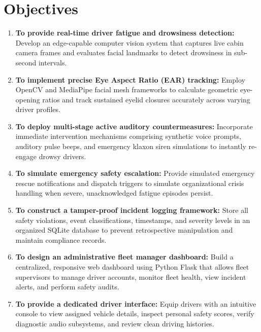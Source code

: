 \documentclass[a4paper,12pt]{report}
\begin{document}
\section{Objectives}
\begin{enumerate}
\item \textbf{To provide real-time driver fatigue and drowsiness detection:}
Develop an edge-capable computer vision system that captures live cabin camera frames and evaluates facial landmarks to detect drowsiness in sub-second intervals.

\item \textbf{To implement precise Eye Aspect Ratio (EAR) tracking:}
Employ OpenCV and MediaPipe facial mesh frameworks to calculate geometric eye-opening ratios and track sustained eyelid closures accurately across varying driver profiles.

\item \textbf{To deploy multi-stage active auditory countermeasures:}
Incorporate immediate intervention mechanisms comprising synthetic voice prompts, auditory pulse beeps, and emergency klaxon siren simulations to instantly re-engage drowsy drivers.

\item \textbf{To simulate emergency safety escalation:}
Provide simulated emergency rescue notifications and dispatch triggers to simulate organizational crisis handling when severe, unacknowledged fatigue episodes persist.

\item \textbf{To construct a tamper-proof incident logging framework:}
Store all safety violations, event classifications, timestamps, and severity levels in an organized SQLite database to prevent retrospective manipulation and maintain compliance records.

\item \textbf{To design an administrative fleet manager dashboard:}
Build a centralized, responsive web dashboard using Python Flask that allows fleet supervisors to manage driver accounts, monitor fleet health, view incident alerts, and perform safety audits.

\item \textbf{To provide a dedicated driver interface:}
Equip drivers with an intuitive console to view assigned vehicle details, inspect personal safety scores, verify diagnostic audio subsystems, and review clean driving histories.
\end{enumerate}

\end{document}
